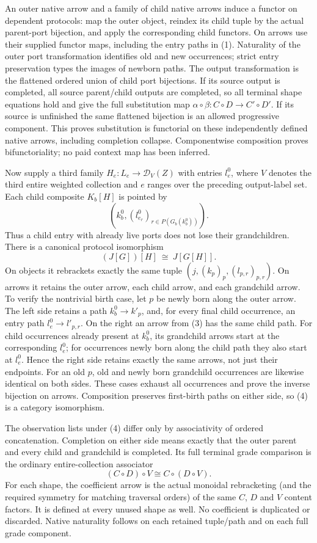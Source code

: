 \documentclass[11pt]{article}
\begin{document}
An outer native arrow and a family of child native arrows induce a functor on dependent protocols: map the outer object, reindex its child tuple by the actual parent-port bijection, and apply the corresponding child functors. On arrows use their supplied functor maps, including the entry paths in (1). Naturality of the outer port transformation identifies old and new occurrences; strict entry preservation types the images of newborn paths. The output transformation is the flattened ordered union of child port bijections. If its source output is completed, all source parent/child outputs are completed, so all terminal shape equations hold and give the full substitution map $\alpha\circ\beta:C\circ D\to C'\circ D'$. If its source is unfinished the same flattened bijection is an allowed progressive component. This proves substitution is functorial on these independently defined native arrows, including completion collapse. Componentwise composition proves bifunctoriality; no paid context map has been inferred.

Now supply a third family $H_e:L_e\to\mathcal D_V(Z)$ with entries $l_e^0$, where $V$ denotes the third entire weighted collection and $e$ ranges over the preceding output-label set. Each child composite $K_b[H]$ is pointed by
\[
        (k_b^0,(l^0_{e_r})_{r\in P(G_b(k_b^0))}).        \tag{3}
\]
Thus a child entry with already live ports does not lose their grandchildren. There is a canonical protocol isomorphism
\[
             (J[G])[H]\ \cong\ J[G[H]].                \tag{4}
\]
On objects it rebrackets exactly the same tuple $(j,(k_p)_p,(l_{p,r})_{p,r})$. On arrows it retains the outer arrow, each child arrow, and each grandchild arrow. To verify the nontrivial birth case, let $p$ be newly born along the outer arrow. The left side retains a path $k_b^0\to k'_p$, and, for every final child occurrence, an entry path $l_e^0\to l'_{p,r}$. On the right an arrow from (3) has the same child path. For child occurrences already present at $k_b^0$, its grandchild arrows start at the corresponding $l_e^0$; for occurrences newly born along the child path they also start at $l_e^0$. Hence the right side retains exactly the same arrows, not just their endpoints. For an old $p$, old and newly born grandchild occurrences are likewise identical on both sides. These cases exhaust all occurrences and prove the inverse bijection on arrows. Composition preserves first-birth paths on either side, so (4) is a category isomorphism.

The observation lists under (4) differ only by associativity of ordered concatenation. Completion on either side means exactly that the outer parent and every child and grandchild is completed. Its full terminal grade comparison is the ordinary entire-collection associator
\[
                   (C\circ D)\circ V\cong C\circ(D\circ V).
\]
For each shape, the coefficient arrow is the actual monoidal rebracketing (and the required symmetry for matching traversal orders) of the same $C$, $D$ and $V$ content factors. It is defined at every unused shape as well. No coefficient is duplicated or discarded. Native naturality follows on each retained tuple/path and on each full grade component.
\end{document}
